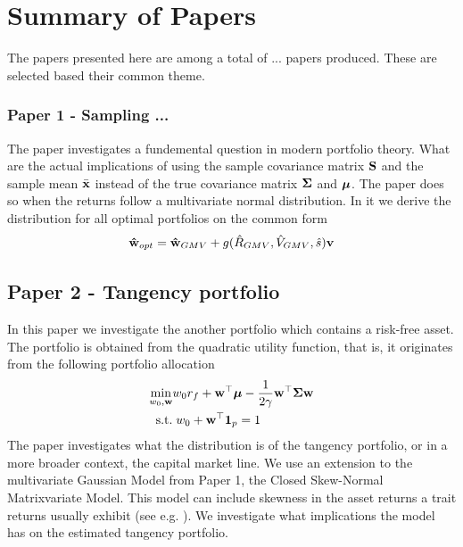 \documentclass[]{book}\usepackage{knitr}
\begin{document}
\chapter{Summary of Papers}\label{ch:papersummary}


The papers presented here are among a total of ... papers produced. These are selected based their common theme.
\subsection*{Paper 1 - Sampling ...}\label{sec:paper1}
The paper investigates a fundemental question in modern portfolio theory. What are the actual implications of using the sample covariance matrix $\mathbf{S}$ and the sample mean $\bar{\mathbf{x}}$ instead of the true covariance matrix $\mathbf{\Sigma}$ and $\mbox{\boldmath$\mu$}$. The paper does so when the returns follow a multivariate normal distribution. In it we derive the distribution for all optimal portfolios on the common form
$$
\mathbf{\hat{w}}_{opt} = \mathbf{\hat{w}}_{GMV} + g(\hat{R}_{GMV}, \hat{V}_{GMV}, \hat{s})\mathbf{v}
$$


\section*{Paper 2 - Tangency portfolio}\label{sec:paper2}
In this paper we investigate the another portfolio which contains a risk-free asset. The portfolio is obtained from the quadratic utility function, that is, it originates from the following portfolio allocation 
\begin{align}
  \min_{w_0,\mathbf{w}} & w_0 r_f + \mathbf{w}^\top \mbox{\boldmath$\mu$} - \frac{1}{2\gamma} \mathbf{w}^\top \mathbf{\Sigma} \mathbf{w} \\
  \text{ s.t.} &\; w_0 + \mathbf{w}^\top \mathbf{1}_p = 1
\end{align}
The paper investigates what the distribution is of the tangency portfolio, or in a more broader context, the capital market line. We use an extension to the multivariate Gaussian Model from Paper 1, the Closed Skew-Normal Matrixvariate Model. This model can include skewness in the asset returns a trait returns usually exhibit (see e.g. \citet{cont2001empirical}). We investigate what implications the model has on the estimated tangency portfolio.
\end{document}
